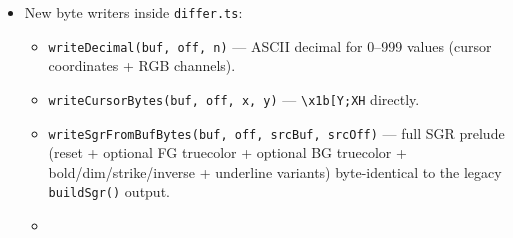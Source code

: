 \begin{itemize}
\tightlist
\item
  New byte writers inside \texttt{d\allowbreak{}i\allowbreak{}f\allowbreak{}f\allowbreak{}e\allowbreak{}r\allowbreak{}.\allowbreak{}t\allowbreak{}s}:

  \begin{itemize}
  \tightlist
  \item
    \texttt{w\allowbreak{}r\allowbreak{}i\allowbreak{}t\allowbreak{}e\allowbreak{}D\allowbreak{}e\allowbreak{}c\allowbreak{}i\allowbreak{}m\allowbreak{}a\allowbreak{}l\allowbreak{}(\allowbreak{}b\allowbreak{}u\allowbreak{}f\allowbreak{},\allowbreak{} \allowbreak{}o\allowbreak{}f\allowbreak{}f\allowbreak{},\allowbreak{} \allowbreak{}n\allowbreak{})} --- ASCII decimal for 0--999 values (cursor coordinates + RGB channels).
  \item
    \texttt{w\allowbreak{}r\allowbreak{}i\allowbreak{}t\allowbreak{}e\allowbreak{}C\allowbreak{}u\allowbreak{}r\allowbreak{}s\allowbreak{}o\allowbreak{}r\allowbreak{}B\allowbreak{}y\allowbreak{}t\allowbreak{}e\allowbreak{}s\allowbreak{}(\allowbreak{}b\allowbreak{}u\allowbreak{}f\allowbreak{},\allowbreak{} \allowbreak{}o\allowbreak{}f\allowbreak{}f\allowbreak{},\allowbreak{} \allowbreak{}x\allowbreak{},\allowbreak{} \allowbreak{}y\allowbreak{})} --- \texttt{\textbackslash{}\allowbreak{}x\allowbreak{}1\allowbreak{}b\allowbreak{}[\allowbreak{}Y\allowbreak{};\allowbreak{}X\allowbreak{}H} directly.
  \item
    \texttt{w\allowbreak{}r\allowbreak{}i\allowbreak{}t\allowbreak{}e\allowbreak{}S\allowbreak{}g\allowbreak{}r\allowbreak{}F\allowbreak{}r\allowbreak{}o\allowbreak{}m\allowbreak{}B\allowbreak{}u\allowbreak{}f\allowbreak{}B\allowbreak{}y\allowbreak{}t\allowbreak{}e\allowbreak{}s\allowbreak{}(\allowbreak{}b\allowbreak{}u\allowbreak{}f\allowbreak{},\allowbreak{} \allowbreak{}o\allowbreak{}f\allowbreak{}f\allowbreak{},\allowbreak{} \allowbreak{}s\allowbreak{}r\allowbreak{}c\allowbreak{}B\allowbreak{}u\allowbreak{}f\allowbreak{},\allowbreak{} \allowbreak{}s\allowbreak{}r\allowbreak{}c\allowbreak{}O\allowbreak{}f\allowbreak{}f\allowbreak{})} --- full SGR prelude (reset + optional FG truecolor + optional BG truecolor + bold/dim/strike/inverse + underline variants) byte-identical to the legacy \texttt{b\allowbreak{}u\allowbreak{}i\allowbreak{}l\allowbreak{}d\allowbreak{}S\allowbreak{}g\allowbreak{}r\allowbreak{}(\allowbreak{})} output.
  \item

\end{itemize}
\end{itemize}

